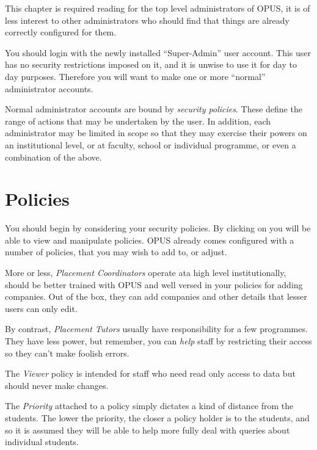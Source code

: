 \documentclass[12 pt]{book}
\begin{document}
This chapter is required reading for the top level administrators of OPUS, it
is of less interest to other administrators who should find that things are
already correctly configured for them.

You should login with the newly installed ``Super-Admin'' user account. This
user has no security restrictions imposed on it, and it is unwise to use it
for day to day purposes. Therefore you will want to make one or more ``normal''
administrator accounts.


Normal administrator accounts are bound by \emph{security policies}. These
define the range of actions that may be undertaken by the user. In addition, 
each administrator may be limited in scope so that they may exercise their
powers on an institutional level, or at faculty, school or individual
programme, or even a combination of the above.

\section{Policies}

You should begin by considering your security policies. By clicking on
 you will be able to view and manipulate
policies. OPUS already comes configured with a number of policies, that you may
wish to add to, or adjust.

More or less, \emph{Placement Coordinators} operate ata high level
institutionally, should be better trained with OPUS and well versed in your
policies for adding companies. Out of the box, they can add companies and other
details that lesser users can only edit.

By contrast, \emph{Placement Tutors} usually have responsibility for a few
programmes. They have less power, but remember, you can \emph{help} staff by
restricting their access so they can't make foolish errors.

The \emph{Viewer} policy is intended for staff who need read only access to
data but should never make changes.

The \emph{Priority} attached to a policy simply dictates a kind of distance
from the students. The lower the priority, the closer a policy holder is to
the students, and so it is assumed they will be able to help more fully deal
with queries about individual students.
\end{document}
